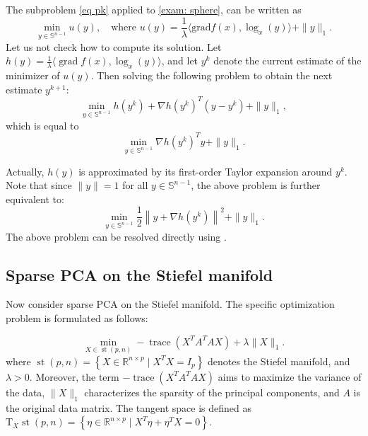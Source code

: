 \documentclass[pdflatex,sn-mathphys-num]{sn-jnl}%
\theoremstyle{definition} %
\theoremstyle{remark} %
\newcommand{\grad}{\mathrm{grad}}
\begin{document}
The subproblem \eqref{eq pk} applied to \eqref{exam: sphere}, can be written as
\begin{equation}
    \min _{y \in \mathbb{S}^{n-1}} u(y), \quad \text {where } u(y)=\frac{1}{\lambda}\langle\grad f(x), \log _x(y)\rangle +\|y\|_1 .
\end{equation}
Let us not check how to compute its solution. 
Let \( h(y) = \frac{1}{\lambda} \langle \operatorname{grad} f(x), \log_x(y) \rangle \), and let \( y^k \) denote the current estimate of the minimizer of \( u(y) \). Then solving the following problem to obtain the next estimate \( y^{k+1} \):
$$
\min _{y \in \mathbb{S}^{n-1}} h(y^k)+\nabla h(y^k)^T (y-y^k)+\|y\|_1,
$$
which is equal to 
$$
\min _{y \in \mathbb{S}^{n-1}} \nabla h(y^k)^T y+\|y\|_1.$$

Actually, \( h(y) \) is approximated by its first-order Taylor expansion around \( y^k \). Note that since \( \|y\| = 1 \) for all \( y \in \mathbb{S}^{n-1} \), the above problem is further equivalent to:
\begin{equation}\label{spheresubproblen}
    \min _{y \in \mathbb{S}^{n-1}} \frac{1}{2}\left\|y+\nabla h(y^k)\right\|^2+\|y\|_1.
\end{equation}
The above problem can be resolved directly using \cite[Lemma D.1]{huang_riemannian_2022}.









\subsection{Sparse PCA on the Stiefel manifold}
Now consider sparse PCA on the Stiefel manifold. The specific optimization problem is formulated as follows:

\begin{equation}\label{ex:st}
    \min _{X \in \operatorname{st}(p, n)}-\operatorname{trace}\left(X^T A^T A X\right)+ \lambda \|X\|_1.
\end{equation}
where $ \operatorname{st}(p, n)=\left\{X \in \mathbb{R}^{n \times p} \mid X^T X=I_p\right\}$ denotes the Stiefel manifold, and $\lambda > 0$.
Moreover, the term $-\operatorname{trace}\left (X^T A^T A X\right)$ aims to maximize the variance of the data, \(\|X\|_1\) characterizes the sparsity of the principal components, and \( A \) is the original data matrix.
The tangent space  is defined as
$
\mathrm{T}_X \operatorname{st}(p, n)=\left\{\eta \in \mathbb{R}^{n \times p} \mid X^T \eta+\eta^T X=0\right\} .
$
\end{document}
